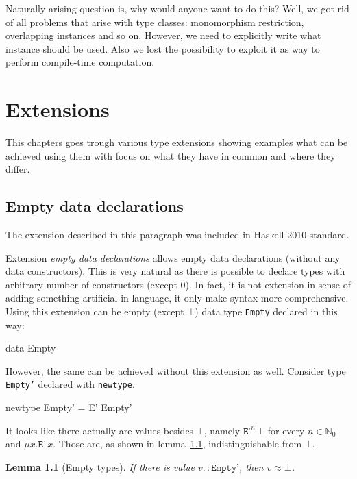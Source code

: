 \documentclass[11pt,oneside,draft]{fithesis2}
\newtheorem{lemma}{Lemma}
\theoremstyle{definition}
\begin{document}
Naturally arising question is, why would anyone want to do this?
Well, we got rid of all problems that arise with type classes:
monomorphism restriction, overlapping instances and so on.
However, we need to explicitly write what instance should be used.
Also we lost the possibility
to exploit it as way to perform compile-time computation.

\chapter{Extensions}

This chapters goes trough various type extensions showing examples
what can be achieved using them with focus on what they have in common
and where they differ.

\section{Empty data declarations}

The extension described in this paragraph was included in Haskell 2010 standard.

Extension \emph{empty data declarations} allows empty data declarations
(without any data constructors). This is very natural as there is possible
to declare types with arbitrary number of constructors (except 0). In
fact, it is not extension in sense of adding something artificial in
language, it only make syntax more comprehensive. Using this extension can
be empty (except \(\bot\)) data type \texttt{Empty} declared in this way:
\begin{code}
data Empty
\end{code}
However, the same can be achieved without this extension as well. Consider type \texttt{Empty'}
declared with \texttt{newtype}.
\begin{code}
newtype Empty' = E' Empty'
\end{code}
It looks like there actually are values besides \(\bot\), namely \(\texttt{E'}^n \, \bot\)
for every \(n \in \mathbb{N}_0\) and \(\mu x . \texttt{E'} \, x\).
Those are, as shown in lemma~\ref{emptyTypes}, indistinguishable from \(\bot\).

\begin{lemma}[Empty types]
\label{emptyTypes}
If there is value \(v :: \texttt{Empty'}\), then \(v \approx \bot\).
\end{lemma}
\end{document}

